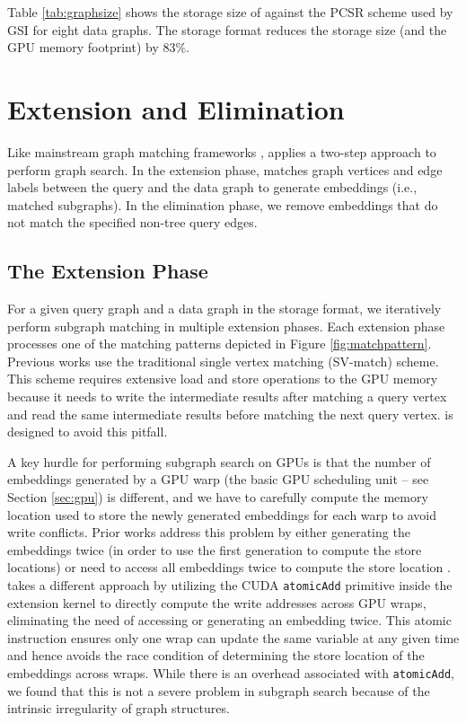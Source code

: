 Table \ref{tab:graphsize} shows the storage size of \SystemName against the PCSR scheme used by GSI for eight data graphs. The \SystemName storage
format reduces the storage size (and the GPU memory footprint) by 83\%.

\section{Extension and Elimination\label{sec:extensionphase}}
Like mainstream graph matching frameworks \cite{tran2015fast, zeng2020gsi}, \SystemName applies a two-step approach to perform graph
search. In the extension phase, \SystemName matches graph vertices and edge labels between the query and the data graph to generate embeddings (i.e., matched subgraphs). In the elimination phase, we remove embeddings that do not match the specified non-tree query edges.


\subsection{The Extension Phase}

For a given query graph and a data graph in the \SystemName storage format, we iteratively perform subgraph matching in multiple extension
phases. Each extension phase processes one of the matching patterns depicted in Figure \ref {fig:matchpattern}. Previous works
\cite{zeng2020gsi,sun2020subgraph} use the traditional single vertex matching (SV-match) scheme. This scheme requires extensive load and
store operations to the GPU memory because it needs to write the intermediate results after matching a query vertex and read the same
intermediate results before matching the next query vertex. \SystemName is designed to avoid this pitfall.


A key hurdle for performing subgraph search on GPUs is that the number of embeddings generated by a GPU warp (the basic
GPU scheduling unit – see Section \ref {sec:gpu}) is different, and we have to carefully compute the memory location
used to store the newly generated embeddings for each warp to avoid write conflicts. Prior works address this problem
by either generating the embeddings twice (in order to use the first generation to compute the store locations)
\cite{tran2015fast} or need to access all embeddings twice to compute the store location \cite{zeng2020gsi}.
\SystemName takes a different approach by utilizing the CUDA \texttt{atomicAdd} primitive inside the extension kernel
to directly compute the write addresses across GPU wraps, eliminating the need of accessing or generating an embedding
twice. This atomic instruction ensures only one wrap can update the same variable at any given time and hence avoids
the race condition of determining the store location of the embeddings across wraps. While there is an overhead
associated with \texttt{atomicAdd}, we found that this is not a severe problem in subgraph search because of the
intrinsic irregularity of graph structures.

